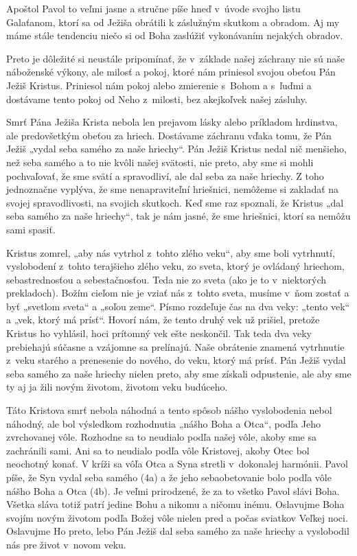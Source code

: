 Apoštol Pavol to veľmi jasne a stručne píše hneď v~úvode svojho listu Galaťanom, ktorí sa od Ježiša obrátili k záslužným skutkom a obradom. Aj my máme stále tendenciu niečo si od Boha zaslúžiť vykonávaním nejakých obradov. 

Preto je dôležité si neustále pripomínať, že v~základe našej záchrany nie sú naše náboženské výkony, ale milosť a pokoj, ktoré nám priniesol svojou obeťou Pán Ježiš Kristus. Priniesol nám pokoj alebo zmierenie s~Bohom a s~ľuďmi a dostávame tento pokoj od Neho z~milosti, bez akejkoľvek našej zásluhy.

Smrť Pána Ježiša Krista nebola len prejavom lásky alebo príkladom hrdinstva, ale predovšetkým obeťou za hriech. Dostávame záchranu vďaka tomu, že Pán Ježiš „vydal seba samého za naše hriechy“. Pán Ježiš Kristus nedal nič menšieho, než seba samého a to nie kvôli našej svätosti, nie preto, aby sme si mohli pochvaľovať, že sme svätí a spravodliví, ale dal seba za naše hriechy. Z toho jednoznačne vyplýva, že sme nenapraviteľní hriešnici, nemôžeme si zakladať na svojej spravodlivosti, na svojich skutkoch. Keď sme raz spoznali, že Kristus „dal seba samého za naše hriechy“, tak je nám jasné, že sme hriešnici, ktorí sa nemôžu sami spasiť.

Kristus zomrel, „aby nás vytrhol z~tohto zlého veku“, aby sme boli vytrhnutí, vyslobodení z~tohto terajšieho zlého veku, zo sveta, ktorý je ovládaný hriechom, sebastrednosťou a sebestačnosťou. Teda nie zo sveta (ako je to v~niektorých prekladoch). Božím cieľom nie je vziať nás z~tohto sveta,  musíme v~ňom zostať a byť „svetlom sveta“ a „soľou zeme“. Písmo rozdeľuje čas na dva veky: „tento vek“ a „vek, ktorý má prísť“. Hovorí nám, že tento druhý vek už prišiel, pretože Kristus ho vyhlásil, hoci prítomný vek ešte neskončil. Tak teda dva veky prebiehajú súčasne a vzájomne sa prelínajú. Naše obrátenie znamená vytrhnutie z~veku starého a prenesenie do nového, do veku, ktorý má prísť.  Pán Ježiš vydal seba samého za naše hriechy nielen preto, aby sme získali odpustenie, ale aby sme ty aj ja žili novým životom, životom veku budúceho.

Táto Kristova smrť nebola náhodná a tento spôsob nášho vyslobodenia nebol náhodný, ale bol výsledkom rozhodnutia „nášho Boha a Otca“, podľa Jeho zvrchovanej vôle. Rozhodne sa to neudialo podľa našej vôle, akoby sme sa zachránili sami. Ani sa to neudialo podľa vôle Kristovej, akoby Otec bol neochotný konať. V kríži sa vôľa Otca a Syna stretli v~dokonalej harmónii. Pavol píše, že Syn vydal seba samého (4a) a že jeho sebaobetovanie bolo podľa vôle nášho Boha a Otca (4b).
Je veľmi prirodzené, že za to všetko Pavol slávi Boha. Všetka sláva totiž patrí jedine Bohu a nikomu a ničomu inému. Oslavujme Boha svojím novým životom podľa Božej vôle nielen pred a počas sviatkov Veľkej noci. Oslavujme Ho preto, lebo Pán Ježiš dal seba samého za naše hriechy a vyslobodil nás pre život v~novom veku. 			
                 
